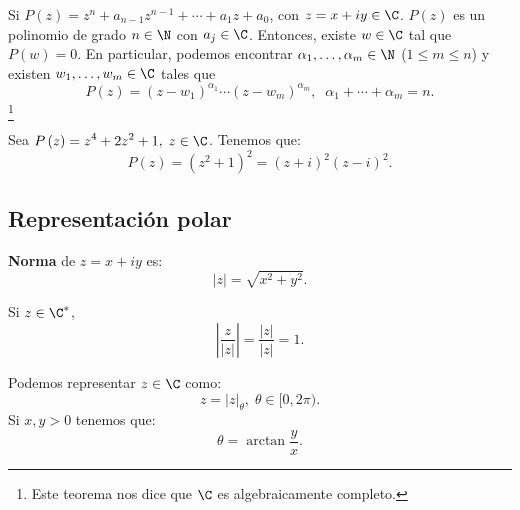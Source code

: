 \begin{ftheorem}
\normalfont Si $\displaystyle P\left(z\right) = z^{n} + a_{n-1}z^{n-1}+\cdots +a_{1}z + a_{0} $, con $\displaystyle z = x + iy \in \C $. $\displaystyle P\left(z\right) $ es un polinomio de grado $\displaystyle n  \in \N$ con $\displaystyle a_{j}\in \C $. Entonces, existe $\displaystyle w \in \C $ tal que $\displaystyle P\left(w\right) = 0 $. En particular, podemos encontrar $\displaystyle \alpha_{1}, \ldots, \alpha_{m}\in \N $ ($\displaystyle 1 \leq m \leq n $) y existen $\displaystyle w_{1}, \ldots, w_{m}\in \C $ tales que 
\[P\left(z\right) = \left(z-w_{1}\right)^{\alpha_{1}} \cdots \left(z-w_{m}\right)^{\alpha_{m}}, \;\; \alpha_{1} + \cdots + \alpha_{m} = n.\]
\footnote{Este teorema nos dice que $\displaystyle \C $ es algebraicamente completo.} 
\end{ftheorem}

\begin{eg}
\normalfont Sea $\displaystyle P\left(z\right) = z^{4} + 2z^{2} +1, \; z\in \C $. Tenemos que:
\[P\left(z\right) = \left(z^{2} + 1\right)^{2} = \left(z+i\right)^{2}\left(z-i\right)^{2} .\]
\end{eg}

\subsection{Representación polar}

\begin{fdefinition}[]
\normalfont \textbf{Norma} de $\displaystyle z = x + iy $ es:
\[ \left|z\right| = \sqrt{x^{2}+y^{2}} .\]
\end{fdefinition}

\begin{ftheorem}[]
\normalfont Si $\displaystyle z \in \C^{*} $, 
\[ \left| \frac{z}{ \left|z\right|}\right| = \frac{ \left|z\right|}{ \left|z\right|} = 1 .\]
\end{ftheorem}

\begin{fdefinition}[]
\normalfont Podemos representar $\displaystyle z \in \C $ como:
\[z = \left|z\right|_{\theta}, \; \theta \in [0,2\pi) .\]
Si $\displaystyle x,y > 0 $ tenemos que:
\[\theta = \arctan\frac{y}{x} .\]
\end{fdefinition}

